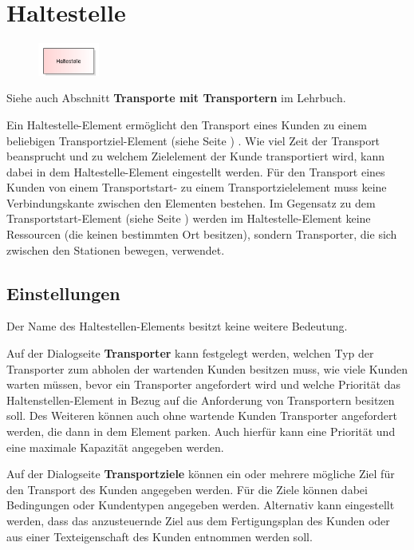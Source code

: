\section{Haltestelle}
\label{ref:ModelElementTransportTransporterSource}

\begin{figure}
\vspace{-22pt}
\includegraphics[width=2cm]{imageModelElementTransportTransporterSource.png}
\vspace{-22pt}
\end{figure}

Siehe auch Abschnitt \textbf{Transporte mit Transportern} im Lehrbuch.

Ein Haltestelle-Element ermöglicht den Transport eines Kunden zu einem beliebigen
Transportziel-Element (siehe Seite \pageref{ref:ModelElementTransportDestination}) . Wie viel
Zeit der Transport beansprucht und zu welchem Zielelement der Kunde transportiert
wird, kann dabei in dem Haltestelle-Element eingestellt werden.
Für den Transport eines Kunden von einem Transportstart- zu einem Transportzielelement
muss keine Verbindungskante zwischen den Elementen bestehen.
Im Gegensatz zu dem Transportstart-Element (siehe Seite \pageref{ref:ModelElementTransportSource}) 
werden im Haltestelle-Element keine Ressourcen (die keinen bestimmten Ort besitzen),
sondern Transporter, die sich zwischen den Stationen bewegen, verwendet.

\subsection*{Einstellungen}

Der Name des Haltestellen-Elements besitzt keine weitere Bedeutung.

Auf der Dialogseite \textbf{Transporter} kann festgelegt werden, welchen
Typ der Transporter zum abholen der wartenden Kunden besitzen muss,
wie viele Kunden warten müssen, bevor ein Transporter angefordert wird
und welche Priorität das Haltenstellen-Element in Bezug auf die
Anforderung von Transportern besitzen soll.
Des Weiteren können auch ohne wartende Kunden Transporter angefordert
werden, die dann in dem Element parken. Auch hierfür kann eine Priorität
und eine maximale Kapazität angegeben werden.

Auf der Dialogseite \textbf{Transportziele} können ein oder mehrere
mögliche Ziel für den Transport des Kunden angegeben werden. Für die Ziele können dabei
Bedingungen oder Kundentypen angegeben werden. Alternativ kann eingestellt werden, dass
das anzusteuernde Ziel aus dem Fertigungsplan des Kunden oder aus einer Texteigenschaft
des Kunden entnommen werden soll.

